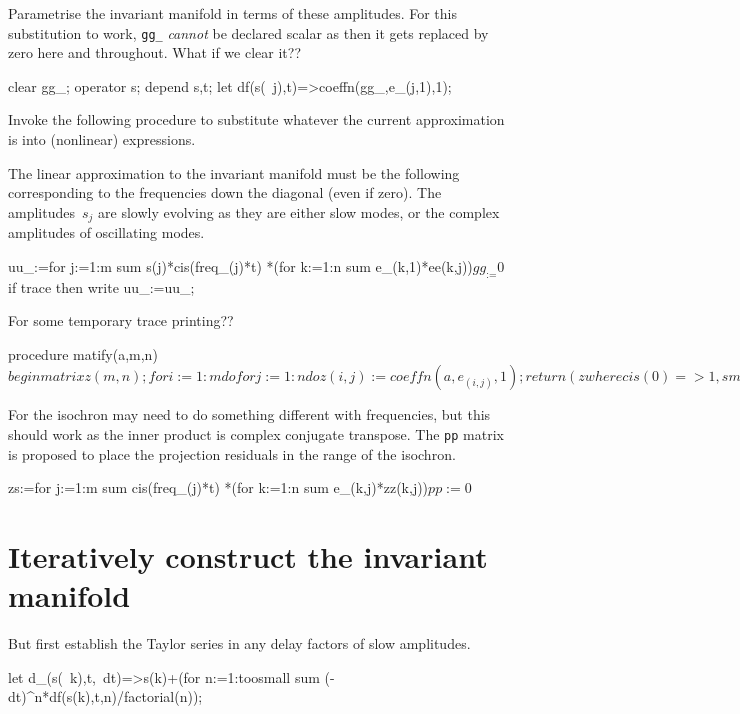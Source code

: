 \documentclass[11pt,a5paper]{article}
\begin{document}
Parametrise the invariant manifold in terms of these
amplitudes. For this substitution to work, \verb|gg_|
\emph{cannot} be declared scalar as then it gets replaced by
zero here and throughout.  What if we clear it??
\begin{reduce}
clear gg_;
operator s; depend s,t;
let df(s(~j),t)=>coeffn(gg_,e_(j,1),1);
\end{reduce}


Invoke the following procedure to substitute whatever the
current approximation is into (nonlinear) expressions.


The linear approximation to the invariant manifold must be
the following corresponding to the frequencies down the
diagonal (even if zero). The amplitudes~$s_j$ are slowly
evolving as they are either slow modes, or the complex
amplitudes of oscillating modes.
\begin{reduce}
uu_:=for j:=1:m sum s(j)*cis(freq_(j)*t)
  *(for k:=1:n sum e_(k,1)*ee(k,j))$
gg_:=0$
if trace then write uu_:=uu_;
\end{reduce}

For some temporary trace printing??
\begin{reduce}
procedure matify(a,m,n)$
  begin matrix z(m,n);
    for i:=1:m do for j:=1:n do z(i,j):=coeffn(a,e_(i,j),1);
    return (z where {cis(0)=>1,small=>s}); 
    end$
\end{reduce}

For the isochron may need to do something different with
frequencies, but this should work as the inner product is
complex conjugate transpose. The \verb|pp| matrix is
proposed to place the projection residuals in the range of
the isochron. 
\begin{reduce}
zs:=for j:=1:m sum cis(freq_(j)*t)
  *(for k:=1:n sum e_(k,j)*zz(k,j))$
pp:=0$
\end{reduce}




\section{Iteratively construct the invariant manifold}

But first establish the Taylor series in any delay factors
of slow amplitudes.
\begin{reduce}
let d_(s(~k),t,~dt)=>s(k)+(for n:=1:toosmall sum 
        (-dt)^n*df(s(k),t,n)/factorial(n));
\end{reduce}
\end{document}

